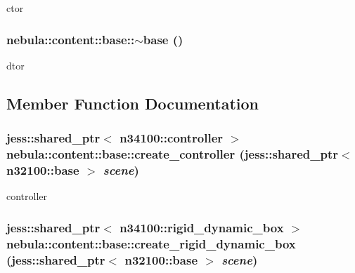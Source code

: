 ctor \hypertarget{classnebula_1_1content_1_1base_ae80fb05ce9451bad1903e5f931cef3ad}{
\subsubsection[{$\sim$base}]{\setlength{\rightskip}{0pt plus 5cm}nebula::content::base::$\sim$base ()}}
\label{classnebula_1_1content_1_1base_ae80fb05ce9451bad1903e5f931cef3ad}


dtor 

\subsection{Member Function Documentation}
\hypertarget{classnebula_1_1content_1_1base_ab2dec7dc05a3e0aaaa2c71ff0f85f79f}{
\subsubsection[{create\_\-controller}]{\setlength{\rightskip}{0pt plus 5cm}jess::shared\_\-ptr$<$ {\bf n34100::controller} $>$ nebula::content::base::create\_\-controller (jess::shared\_\-ptr$<$ {\bf n32100::base} $>$ {\em scene})}}
\label{classnebula_1_1content_1_1base_ab2dec7dc05a3e0aaaa2c71ff0f85f79f}


controller \hypertarget{classnebula_1_1content_1_1base_a0a92b79bc3531252efed3d4f7d0d5e7b}{
\subsubsection[{create\_\-rigid\_\-dynamic\_\-box}]{\setlength{\rightskip}{0pt plus 5cm}jess::shared\_\-ptr$<$ {\bf n34100::rigid\_\-dynamic\_\-box} $>$ nebula::content::base::create\_\-rigid\_\-dynamic\_\-box (jess::shared\_\-ptr$<$ {\bf n32100::base} $>$ {\em scene})}}
\label{classnebula_1_1content_1_1base_a0a92b79bc3531252efed3d4f7d0d5e7b}


